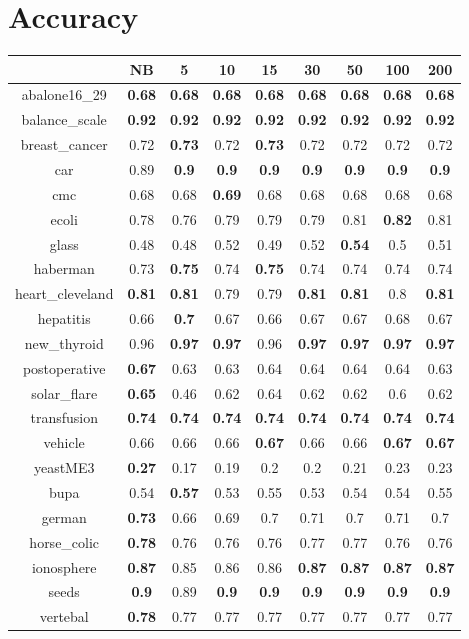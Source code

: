 \documentclass{article}%
\begin{document}
%
\normalsize%
\section*{Accuracy}%
\begin{tabular}{c|cccccccc}%
\hline%
&NB&5&10&15&30&50&100&200\\%
\hline%
abalone16\_29&\textbf{0.68}&\textbf{0.68}&\textbf{0.68}&\textbf{0.68}&\textbf{0.68}&\textbf{0.68}&\textbf{0.68}&\textbf{0.68}\\%
\hline%
balance\_scale&\textbf{0.92}&\textbf{0.92}&\textbf{0.92}&\textbf{0.92}&\textbf{0.92}&\textbf{0.92}&\textbf{0.92}&\textbf{0.92}\\%
\hline%
breast\_cancer&0.72&\textbf{0.73}&0.72&\textbf{0.73}&0.72&0.72&0.72&0.72\\%
\hline%
car&0.89&\textbf{0.9}&\textbf{0.9}&\textbf{0.9}&\textbf{0.9}&\textbf{0.9}&\textbf{0.9}&\textbf{0.9}\\%
\hline%
cmc&0.68&0.68&\textbf{0.69}&0.68&0.68&0.68&0.68&0.68\\%
\hline%
ecoli&0.78&0.76&0.79&0.79&0.79&0.81&\textbf{0.82}&0.81\\%
\hline%
glass&0.48&0.48&0.52&0.49&0.52&\textbf{0.54}&0.5&0.51\\%
\hline%
haberman&0.73&\textbf{0.75}&0.74&\textbf{0.75}&0.74&0.74&0.74&0.74\\%
\hline%
heart\_cleveland&\textbf{0.81}&\textbf{0.81}&0.79&0.79&\textbf{0.81}&\textbf{0.81}&0.8&\textbf{0.81}\\%
\hline%
hepatitis&0.66&\textbf{0.7}&0.67&0.66&0.67&0.67&0.68&0.67\\%
\hline%
new\_thyroid&0.96&\textbf{0.97}&\textbf{0.97}&0.96&\textbf{0.97}&\textbf{0.97}&\textbf{0.97}&\textbf{0.97}\\%
\hline%
postoperative&\textbf{0.67}&0.63&0.63&0.64&0.64&0.64&0.64&0.63\\%
\hline%
solar\_flare&\textbf{0.65}&0.46&0.62&0.64&0.62&0.62&0.6&0.62\\%
\hline%
transfusion&\textbf{0.74}&\textbf{0.74}&\textbf{0.74}&\textbf{0.74}&\textbf{0.74}&\textbf{0.74}&\textbf{0.74}&\textbf{0.74}\\%
\hline%
vehicle&0.66&0.66&0.66&\textbf{0.67}&0.66&0.66&\textbf{0.67}&\textbf{0.67}\\%
\hline%
yeastME3&\textbf{0.27}&0.17&0.19&0.2&0.2&0.21&0.23&0.23\\%
\hline%
bupa&0.54&\textbf{0.57}&0.53&0.55&0.53&0.54&0.54&0.55\\%
\hline%
german&\textbf{0.73}&0.66&0.69&0.7&0.71&0.7&0.71&0.7\\%
\hline%
horse\_colic&\textbf{0.78}&0.76&0.76&0.76&0.77&0.77&0.76&0.76\\%
\hline%
ionosphere&\textbf{0.87}&0.85&0.86&0.86&\textbf{0.87}&\textbf{0.87}&\textbf{0.87}&\textbf{0.87}\\%
\hline%
seeds&\textbf{0.9}&0.89&\textbf{0.9}&\textbf{0.9}&\textbf{0.9}&\textbf{0.9}&\textbf{0.9}&\textbf{0.9}\\%
\hline%
vertebal&\textbf{0.78}&0.77&0.77&0.77&0.77&0.77&0.77&0.77\\%
\hline%
\end{tabular}
\end{document}
